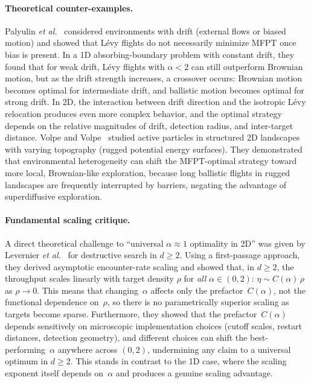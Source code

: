 \paragraph{Theoretical counter-examples.}
Palyulin \emph{et al.}~\cite{palyulin2014levy} considered environments with drift (external flows or biased motion) and showed that L\'evy flights do not necessarily minimize MFPT once bias is present. In a 1D absorbing-boundary problem with constant drift, they found that for weak drift, L\'evy flights with $\alpha < 2$ can still outperform Brownian motion, but as the drift strength increases, a crossover occurs: Brownian motion becomes optimal for intermediate drift, and ballistic motion becomes optimal for strong drift. In 2D, the interaction between drift direction and the isotropic L\'evy relocation produces even more complex behavior, and the optimal strategy depends on the relative magnitudes of drift, detection radius, and inter-target distance. Volpe and Volpe~\cite{volpe2017topography} studied active particles in structured 2D landscapes with varying topography (rugged potential energy surfaces). They demonstrated that environmental heterogeneity can shift the MFPT-optimal strategy toward more local, Brownian-like exploration, because long ballistic flights in rugged landscapes are frequently interrupted by barriers, negating the advantage of superdiffusive exploration.

\paragraph{Fundamental scaling critique.}
A direct theoretical challenge to ``universal $\alpha \approx 1$ optimality in 2D'' was given by Levernier \emph{et al.}~\cite{levernier2020inverse} for destructive search in $d\ge2$. Using a first-passage approach, they derived asymptotic encounter-rate scaling and showed that, in $d\ge2$, the throughput scales linearly with target density $\rho$ for \emph{all} $\alpha\in(0,2)$: $\eta \sim C(\alpha)\,\rho$ as $\rho \to 0$. This means that changing~$\alpha$ affects only the prefactor~$C(\alpha)$, not the functional dependence on~$\rho$, so there is no parametrically superior scaling as targets become sparse. Furthermore, they showed that the prefactor~$C(\alpha)$ depends sensitively on microscopic implementation choices (cutoff scales, restart distances, detection geometry), and different choices can shift the best-performing~$\alpha$ anywhere across $(0,2)$, undermining any claim to a universal optimum in $d\ge2$. This stands in contrast to the 1D case, where the scaling exponent itself depends on~$\alpha$ and produces a genuine scaling advantage.

